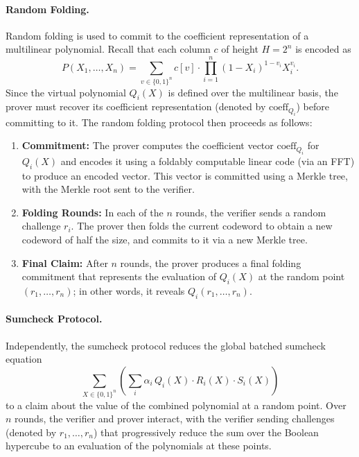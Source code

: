 \documentclass{article}
\begin{document}
\paragraph{Random Folding.}  
Random folding is used to commit to the coefficient representation of a multilinear polynomial. Recall that each column \( c \) of height \( H = 2^n \) is encoded as
\[
P(X_1, \dots, X_n) = \sum_{v \in \{0, 1\}^n} c[v] \cdot \prod_{i=1}^n (1 - X_i)^{1-v_i} X_i^{v_i}.
\]
Since the virtual polynomial \( Q_i(X) \) is defined over the multilinear basis, the prover must recover its coefficient representation (denoted by \(\text{coeff}_{Q_i}\)) before committing to it. The random folding protocol then proceeds as follows:
\begin{enumerate}
    \item \textbf{Commitment:} The prover computes the coefficient vector \(\text{coeff}_{Q_i}\) for \( Q_i(X) \) and encodes it using a foldably computable linear code (via an FFT) to produce an encoded vector. This vector is committed using a Merkle tree, with the Merkle root sent to the verifier.
    \item \textbf{Folding Rounds:} In each of the \( n \) rounds, the verifier sends a random challenge \( r_i \). The prover then folds the current codeword to obtain a new codeword of half the size, and commits to it via a new Merkle tree.
    \item \textbf{Final Claim:} After \( n \) rounds, the prover produces a final folding commitment that represents the evaluation of \( Q_i(X) \) at the random point \( (r_1, \dots, r_n) \); in other words, it reveals \( Q_i(r_1, \dots, r_n) \).
\end{enumerate}

\paragraph{Sumcheck Protocol.}  
Independently, the sumcheck protocol reduces the global batched sumcheck equation
\[
\sum_{X \in \{0, 1\}^n} \left( \sum_i \alpha_i \, Q_i(X) \cdot R_i(X) \cdot S_i(X) \right)
\]
to a claim about the value of the combined polynomial at a random point. Over \( n \) rounds, the verifier and prover interact, with the verifier sending challenges (denoted by \( r_1, \dots, r_n \)) that progressively reduce the sum over the Boolean hypercube to an evaluation of the polynomials at these points.
\end{document}
